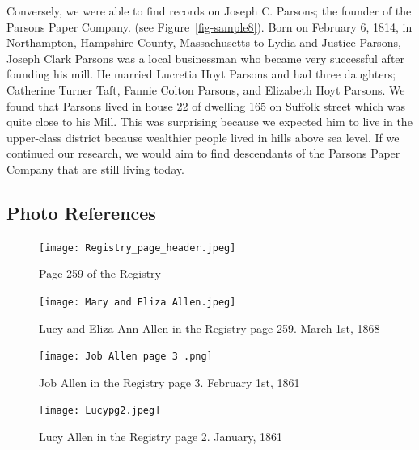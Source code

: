 \documentclass[
  letterpaper,
  DIV=11,
  numbers=noendperiod]{scrartcl}
\begin{document}
Conversely, we were able to find records on Joseph C. Parsons; the
founder of the Parsons Paper Company. (see Figure~\ref{fig-sample8}).
Born on February 6, 1814, in Northampton, Hampshire County,
Massachusetts to Lydia and Justice Parsons, Joseph Clark Parsons was a
local businessman who became very successful after founding his mill. He
married Lucretia Hoyt Parsons and had three daughters; Catherine Turner
Taft, Fannie Colton Parsons, and Elizabeth Hoyt Parsons. We found that
Parsons lived in house 22 of dwelling 165 on Suffolk street which was
quite close to his Mill. This was surprising because we expected him to
live in the upper-class district because wealthier people lived in hills
above sea level. If we continued our research, we would aim to find
descendants of the Parsons Paper Company that are still living today.

\hypertarget{photo-references}{%
\subsection{Photo References}\label{photo-references}}

\begin{figure}

{\centering \texttt{[image: Registry\_page\_header.jpeg]}

}

\caption{\label{fig-sample1}Page 259 of the Registry}

\end{figure}

\begin{figure}

{\centering \texttt{[image: Mary and Eliza Allen.jpeg]}

}

\caption{\label{fig-sample2}Lucy and Eliza Ann Allen in the Registry
page 259. March 1st, 1868}

\end{figure}

\begin{figure}

{\centering \texttt{[image: Job Allen page 3 .png]}

}

\caption{\label{fig-sample3}Job Allen in the Registry page 3. February
1st, 1861}

\end{figure}

\begin{figure}

{\centering \texttt{[image: Lucypg2.jpeg]}

}

\caption{\label{fig-sample4}Lucy Allen in the Registry page 2. January,
1861}

\end{figure}
\end{document}
